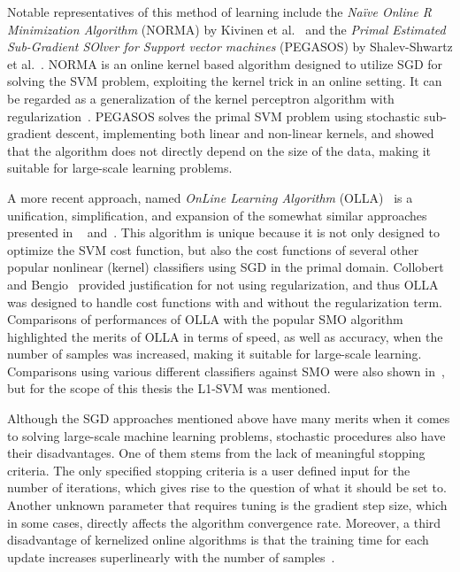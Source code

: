 \documentclass[reqno]{vcuthesis}
\numberwithin{equation}{chapter}
\begin{document}
Notable representatives of this method of learning include the \textit{Na{\"i}ve Online R Minimization Algorithm} (NORMA) by Kivinen et al.~\cite{kivinen2004online} and the \textit{Primal Estimated Sub-Gradient SOlver for Support vector machines} (PEGASOS) by Shalev-Shwartz et al.~\cite{shalev2011pegasos}. NORMA is an online kernel based algorithm designed to utilize SGD for solving the SVM problem, exploiting the kernel trick in an online setting. It can be regarded as a generalization of the kernel perceptron algorithm with regularization~\cite{kivinen2004online}. PEGASOS solves the primal SVM problem using stochastic sub-gradient descent, implementing both linear and non-linear kernels, and showed that the algorithm does not directly depend on the size of the data, making it suitable for large-scale learning problems. 

A more recent approach, named \textit{OnLine Learning Algorithm} (OLLA)~\cite{kecman2016fast} is a unification, simplification, and expansion of the somewhat similar approaches presented in
~\cite{herbrich2016learning,kivinen2002large,Schoelkopf2002,Shalev2014,shalev2011pegasos} and~\cite{kecman2016ieee,Melki2016,melki2016fast}. This algorithm is unique because it is not only designed to optimize the SVM cost function, but also the cost functions of several other popular nonlinear (kernel) classifiers using SGD in the primal domain. Collobert and Bengio~\cite{collobert2004links} provided justification for not using regularization, and thus OLLA was designed to handle cost functions with and without the regularization term. Comparisons of performances of OLLA with the popular SMO algorithm highlighted the merits of OLLA in terms of speed, as well as accuracy, when the number of samples was increased, making it suitable for large-scale learning. Comparisons using various different classifiers against SMO were also shown in~\cite{kecman2016fast}, but for the scope of this thesis the L1-SVM was mentioned.

Although the SGD approaches mentioned above have many merits when it comes to solving large-scale machine learning problems, stochastic procedures also have their disadvantages. One of them stems from the lack of meaningful stopping criteria. The only specified stopping criteria is a user defined input for the number of iterations, which gives rise to the question of what it should be set to. Another unknown parameter that requires tuning is the gradient step size, which in some cases, directly affects the algorithm convergence rate. Moreover, a third disadvantage of kernelized online algorithms is that the training time for each update increases superlinearly with the number of samples~\cite{bottou2004large}.
\end{document}
